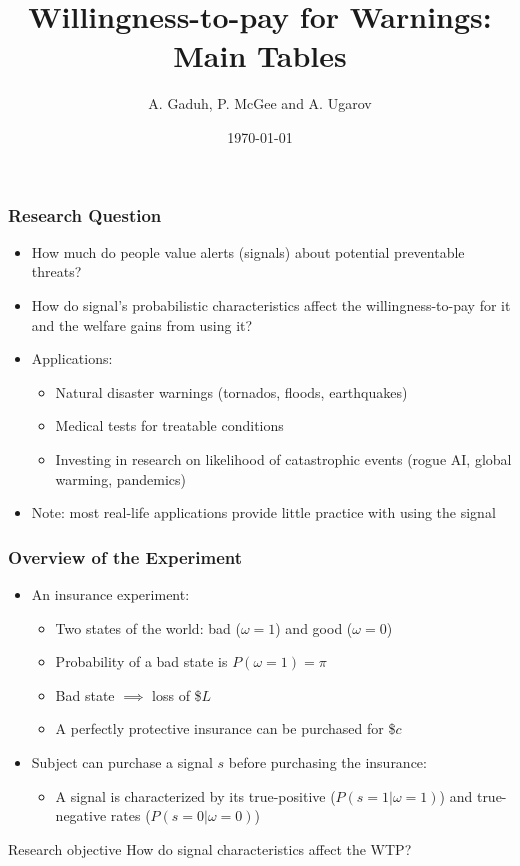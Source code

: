 \documentclass[11pt,hyperref={bookmarks=false}]{beamer}
\title[Willingness-to-pay for Warnings]{Willingness-to-pay for Warnings: Main Tables}
\author[A. Gaduh, P. McGee and A. Ugarov]{A. Gaduh, P. McGee and A. Ugarov}
\institute[]{}
\date{\today}
\newcommand\BackgroundPic{%
\put(0,0){%
\parbox[b][\paperheight]{\paperwidth}{%
\vfill
\centering
\vfill
}}}
\begin{document}

\begin{frame}
\titlepage
\end{frame}


\begin{frame}
\frametitle{Research Question}
\begin{itemize}
	\item How much do people value alerts (signals) about potential preventable threats?
	\item How do signal's probabilistic characteristics affect the willingness-to-pay for it and the welfare gains from using it?
	\item Applications:
	\begin{itemize}
		\item Natural disaster warnings (tornados, floods, earthquakes)
		\item Medical tests for treatable conditions
		\item Investing in research on likelihood of catastrophic events (rogue AI, global warming, pandemics)
	\end{itemize}
	\item Note: most real-life applications provide little practice with using the signal
\end{itemize}
\end{frame}


\begin{frame}
\frametitle{Overview of the Experiment}
\begin{itemize}
	\item An insurance experiment:
		\begin{itemize}
			\item Two states of the world: bad ($\omega=1$) and good ($\omega=0$)
			\item Probability of a bad state is $P (\omega=1) = \pi$
			\item Bad state $\implies$ loss of \$$L$
			\item A perfectly protective insurance can be purchased for \$$c$
		\end{itemize}
	\item Subject can purchase a signal $s$ before purchasing the insurance:
		\begin{itemize}
			\item A signal is characterized by its true-positive ($P(s=1|\omega=1)$) and true-negative rates ($P(s=0|\omega=0)$) 
		\end{itemize}
\end{itemize}

\vspace{1em}
\begin{block}{Research objective}
	How do signal characteristics affect the WTP?
\end{block}
\end{frame}
\end{document}
